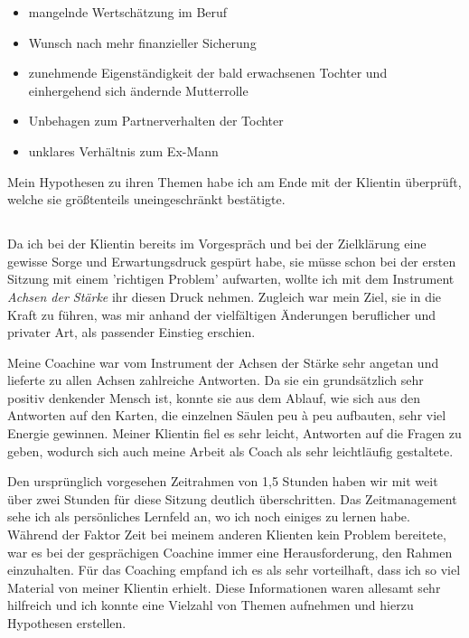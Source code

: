 \documentclass[11pt,a4paper]{article}
\begin{document}
\begin{itemize}

	\item mangelnde Wertschätzung im Beruf
	
	\item Wunsch nach mehr finanzieller Sicherung
	
	\item zunehmende Eigenständigkeit der bald erwachsenen Tochter und einhergehend sich ändernde Mutterrolle
	
	\item Unbehagen zum Partnerverhalten der Tochter
	
	\item unklares Verhältnis zum Ex-Mann

\end{itemize}


Mein Hypothesen zu ihren Themen habe ich am Ende mit der Klientin überprüft, welche sie größtenteils uneingeschränkt bestätigte.


\subsection*{\color{Orange}{Erste Sitzung: Achsen der Stärke}}


Da ich bei der Klientin bereits im Vorgespräch und bei der Zielklärung eine gewisse Sorge und Erwartungsdruck gespürt habe, sie müsse schon bei der ersten Sitzung mit einem 'richtigen Problem' aufwarten, wollte ich mit dem Instrument \textsl{Achsen der Stärke} ihr diesen Druck nehmen. Zugleich war mein Ziel, sie in die Kraft zu führen, was mir anhand der vielfältigen Änderungen beruflicher und privater Art, als passender Einstieg erschien. 

Meine Coachine war vom Instrument der Achsen der Stärke sehr angetan und lieferte zu allen Achsen zahlreiche Antworten. Da sie ein grundsätzlich sehr positiv denkender Mensch ist, konnte sie aus dem Ablauf, wie sich aus den Antworten auf den Karten, die einzelnen Säulen peu à peu aufbauten, sehr viel Energie gewinnen. Meiner Klientin fiel es sehr leicht, Antworten auf die Fragen zu geben, wodurch sich auch meine Arbeit als Coach als sehr leichtläufig gestaltete.

Den ursprünglich vorgesehen Zeitrahmen von 1,5 Stunden haben wir mit weit über zwei Stunden für diese Sitzung deutlich überschritten. Das Zeitmanagement sehe ich als persönliches Lernfeld an, wo ich noch einiges zu lernen habe. Während der Faktor Zeit bei meinem anderen Klienten kein Problem bereitete, war es bei der gesprächigen Coachine immer eine Herausforderung, den Rahmen einzuhalten. Für das Coaching empfand ich es als sehr vorteilhaft, dass ich so viel Material von meiner Klientin erhielt. Diese Informationen waren allesamt sehr hilfreich und ich konnte eine Vielzahl von Themen aufnehmen und hierzu Hypothesen erstellen. 
\end{document}
